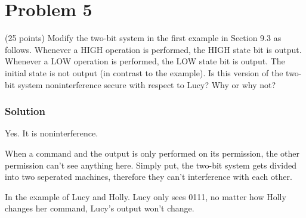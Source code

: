 \section*{Problem 5}
(25 points) Modify the two-bit system in the first example in Section 9.3 as follows. 
Whenever a HIGH operation is performed, the HIGH state bit is output. 
Whenever a LOW operation is performed, the LOW state bit is output. 
The initial state is not output (in contrast to the example). 
Is this version of the two-bit system noninterference secure with respect to Lucy? Why or why not?

\subsubsection*{Solution}

Yes. It is noninterference.

When a command and the output is only performed on its permission, the other permission can't see anything here.
Simply put, the two-bit system gets divided into two seperated machines, therefore they can't interference with each other.

In the example of Lucy and Holly. 
Lucy only sees 0111, no matter how Holly changes her command, Lucy's output won't change.
